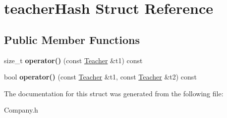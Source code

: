 \hypertarget{structteacher_hash}{}\section{teacher\+Hash Struct Reference}
\label{structteacher_hash}
\subsection*{Public Member Functions}
\begin{DoxyCompactItemize}
\item 
\mbox{\label{structteacher_hash_a1bc296c9246758128b5b0ef790c17f9a}} 
size\+\_\+t {\bfseries operator()} (const \mbox{\hyperlink{class_teacher}{Teacher}} \&t1) const
\item 
\mbox{\label{structteacher_hash_ab1d101833f405ffcbe90bc6aa81fe36f}} 
bool {\bfseries operator()} (const \mbox{\hyperlink{class_teacher}{Teacher}} \&t1, const \mbox{\hyperlink{class_teacher}{Teacher}} \&t2) const
\end{DoxyCompactItemize}


The documentation for this struct was generated from the following file\+:\begin{DoxyCompactItemize}
\item 
Company.\+h\end{DoxyCompactItemize}
